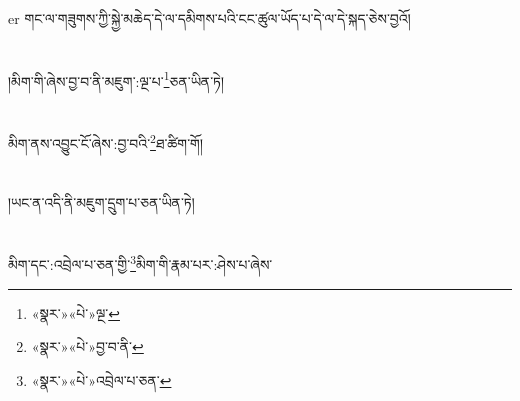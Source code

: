 er{ }གང་ལ་གཟུགས་ཀྱི་སྐྱེ་མཆེད་དེ་ལ་དམིགས་པའི་ངང་ཚུལ་ཡོད་པ་དེ་ལ་དེ་སྐད་ཅེས་བྱའོ།\chapter{ }།མིག་གི་ཞེས་བྱ་བ་ནི་མཇུག་:ལྔ་པ་\footnote{«སྣར་»«པེ་»ལྔ་}ཅན་ཡིན་ཏེ།\chapter{ }མིག་ནས་འབྱུང་ངོ་ཞེས་:བྱ་བའི་\footnote{«སྣར་»«པེ་»བྱ་བ་ནི་}ཐ་ཚིག་གོ།\chapter{ }།ཡང་ན་འདི་ནི་མཇུག་དྲུག་པ་ཅན་ཡིན་ཏེ།\chapter{ }མིག་དང་:འབྲེལ་པ་ཅན་གྱི་\footnote{«སྣར་»«པེ་»འབྲེལ་པ་ཅན་}མིག་གི་རྣམ་པར་:ཤེས་པ་ཞེས་\foo